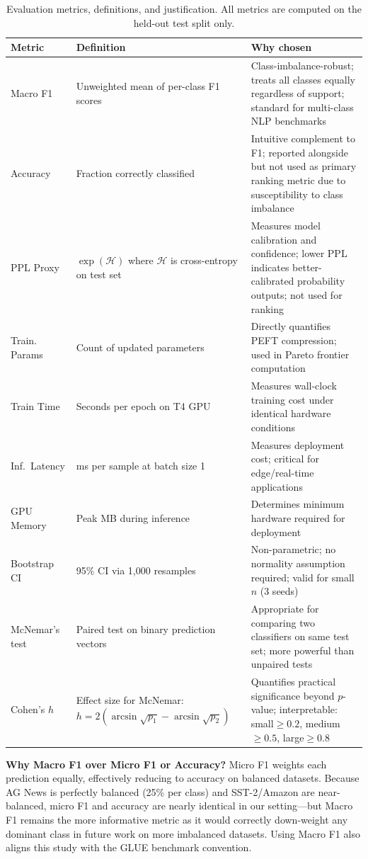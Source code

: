 \documentclass[conference]{IEEEtran}
\begin{document}
\begin{table}[ht]
\centering
\caption{Evaluation metrics, definitions, and justification. All metrics are computed on the held-out test split only.}
\label{tab:metrics}
\renewcommand{\arraystretch}{1.25}
\begin{tabular}{p{1.5cm}p{2.8cm}p{3.4cm}}
\toprule
\textbf{Metric} & \textbf{Definition} & \textbf{Why chosen}\\
\midrule
Macro F1 & Unweighted mean of per-class F1 scores & Class-imbalance-robust; treats all classes equally regardless of support; standard for multi-class NLP benchmarks\\[4pt]
Accuracy & Fraction correctly classified & Intuitive complement to F1; reported alongside but not used as primary ranking metric due to susceptibility to class imbalance\\[4pt]
PPL Proxy & $\exp(\mathcal{H})$ where $\mathcal{H}$ is cross-entropy on test set & Measures model calibration and confidence; lower PPL indicates better-calibrated probability outputs; not used for ranking\\[4pt]
Train. Params & Count of updated parameters & Directly quantifies PEFT compression; used in Pareto frontier computation\\[4pt]
Train Time & Seconds per epoch on T4 GPU & Measures wall-clock training cost under identical hardware conditions\\[4pt]
Inf.\ Latency & ms per sample at batch size 1 & Measures deployment cost; critical for edge/real-time applications\\[4pt]
GPU Memory & Peak MB during inference & Determines minimum hardware required for deployment\\[4pt]
Bootstrap CI & 95\% CI via 1{,}000 resamples & Non-parametric; no normality assumption required; valid for small $n$ (3 seeds)\\[4pt]
McNemar's test & Paired test on binary prediction vectors & Appropriate for comparing two classifiers on same test set; more powerful than unpaired tests\\[4pt]
Cohen's $h$ & Effect size for McNemar: $h{=}2(\arcsin\sqrt{p_1}{-}\arcsin\sqrt{p_2})$ & Quantifies practical significance beyond $p$-value; interpretable: small${\geq}0.2$, medium${\geq}0.5$, large${\geq}0.8$\\
\bottomrule
\end{tabular}
\end{table}

\textbf{Why Macro F1 over Micro F1 or Accuracy?} Micro F1 weights each prediction equally, effectively reducing to accuracy on balanced datasets. Because AG News is perfectly balanced (25\% per class) and SST-2/Amazon are near-balanced, micro F1 and accuracy are nearly identical in our setting---but Macro F1 remains the more informative metric as it would correctly down-weight any dominant class in future work on more imbalanced datasets. Using Macro F1 also aligns this study with the GLUE benchmark convention.
\end{document}
